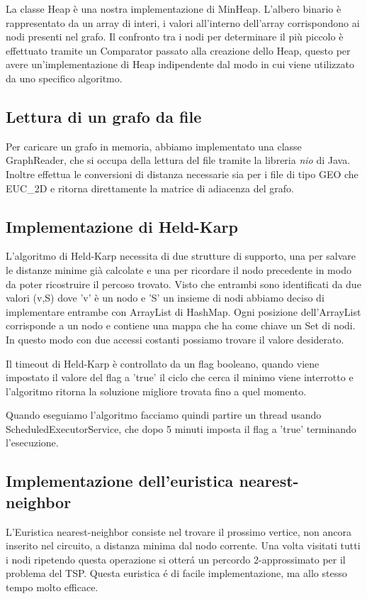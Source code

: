 La classe Heap è una nostra implementazione di MinHeap. L'albero binario è rappresentato da un array di interi, i valori all'interno dell'array corrispondono ai nodi presenti nel grafo. Il confronto tra i nodi per determinare il più piccolo è effettuato tramite un Comparator passato alla creazione dello Heap, questo per avere un'implementazione di Heap indipendente dal modo in cui viene utilizzato da uno specifico algoritmo.
\subsection{Lettura di un grafo da file}
Per caricare un grafo in memoria, abbiamo implementato una classe GraphReader, che si occupa della lettura del file tramite la libreria \textit{nio} di Java. Inoltre effettua le conversioni di distanza necessarie sia per i file di tipo GEO che EUC\_2D e ritorna direttamente la matrice di adiacenza del grafo.


\subsection{Implementazione di Held-Karp}

L'algoritmo di Held-Karp necessita di due strutture di supporto, una per salvare le distanze minime già calcolate e una per ricordare il nodo precedente in modo da poter ricostruire il percoso trovato. Visto che entrambi sono identificati da due valori (v,S) dove 'v' è un nodo e 'S' un insieme di nodi abbiamo deciso di implementare entrambe con ArrayList di HashMap. Ogni posizione dell'ArrayList corrisponde a un nodo e contiene una mappa che ha come chiave un Set di nodi. In questo modo con due accessi costanti possiamo trovare il valore desiderato.

Il timeout di Held-Karp è controllato da un flag booleano, quando viene impostato il valore del flag a 'true' il ciclo che cerca il minimo viene interrotto e l'algoritmo ritorna la soluzione migliore trovata fino a quel momento.

Quando eseguiamo l'algoritmo facciamo quindi partire un thread usando ScheduledExecutorService, che dopo 5 minuti imposta il flag a 'true' terminando l'esecuzione.

\subsection{Implementazione dell'euristica nearest-neighbor}
L'Euristica nearest-neighbor consiste nel trovare il prossimo vertice, non ancora inserito nel circuito, a distanza minima dal nodo corrente. Una volta visitati tutti i nodi
ripetendo questa operazione si otter\'a un percordo 2-approssimato per il problema del TSP. Questa euristica \'e di facile implementazione, ma allo stesso tempo molto efficace.

